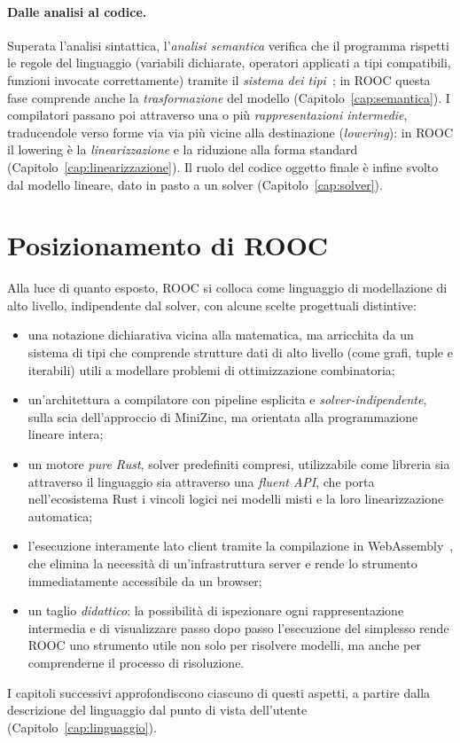 \paragraph{Dalle analisi al codice.}
Superata l'analisi sintattica, l'\emph{analisi semantica} verifica che il
programma rispetti le regole del linguaggio (variabili dichiarate, operatori
applicati a tipi compatibili, funzioni invocate correttamente) tramite il
\emph{sistema dei tipi}~\cite{pierce2002}; in ROOC questa fase comprende anche la
\emph{trasformazione} del modello (Capitolo~\ref{cap:semantica}). I compilatori
passano poi attraverso una o più \emph{rappresentazioni intermedie}, traducendole
verso forme via via più vicine alla destinazione (\emph{lowering}): in ROOC il
lowering è la \emph{linearizzazione} e la riduzione alla forma standard
(Capitolo~\ref{cap:linearizzazione}). Il ruolo del codice oggetto finale è
infine svolto dal modello lineare, dato in pasto a un solver
(Capitolo~\ref{cap:solver}).

\section{Posizionamento di ROOC}
\label{sec:posizionamento}

Alla luce di quanto esposto, ROOC si colloca come linguaggio di modellazione di
alto livello, indipendente dal solver, con alcune scelte progettuali distintive:

\begin{itemize}
  \item una notazione dichiarativa vicina alla matematica, ma arricchita da un
        sistema di tipi che comprende strutture dati di alto livello (come
        grafi, tuple e iterabili) utili a modellare problemi di ottimizzazione
        combinatoria;
  \item un'architettura a compilatore con pipeline esplicita e
        \emph{solver-indipendente}, sulla scia dell'approccio di MiniZinc, ma
        orientata alla programmazione lineare intera;
  \item un motore \emph{pure Rust}, solver predefiniti compresi, utilizzabile
        come libreria sia attraverso il linguaggio sia attraverso una
        \emph{fluent API}, che porta nell'ecosistema Rust i vincoli logici nei
        modelli misti e la loro linearizzazione automatica;
  \item l'esecuzione interamente lato client tramite la compilazione in
        WebAssembly~\cite{webassembly}, che elimina la necessità di
        un'infrastruttura server e rende lo strumento immediatamente
        accessibile da un browser;
  \item un taglio \emph{didattico}: la possibilità di ispezionare ogni
        rappresentazione intermedia e di visualizzare passo dopo passo
        l'esecuzione del simplesso rende ROOC uno strumento utile non solo per
        risolvere modelli, ma anche per comprenderne il processo di risoluzione.
\end{itemize}

\noindent
I capitoli successivi approfondiscono ciascuno di questi aspetti, a partire
dalla descrizione del linguaggio dal punto di vista dell'utente
(Capitolo~\ref{cap:linguaggio}).

